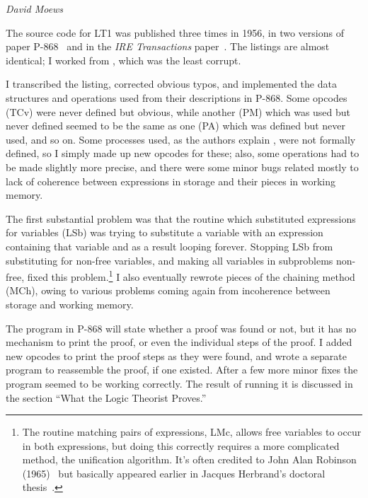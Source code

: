 \documentclass{IEEEcsmag}
\begin{document}
%
%


{\em David Moews}

The source code for LT1 was published three times in 1956, in two
versions of paper P-868~\cite{LT1956a,LT1956b} and in the 
\textit{IRE Transactions} paper~\cite{LT1956c}.  The listings are almost identical; I
worked from \cite{LT1956b}, which was the least corrupt.

I transcribed the listing, corrected obvious typos, and
implemented the data structures and operations used from their
descriptions in P-868.  Some opcodes (TCv) were never defined
but obvious, while another (PM) which was used but never defined
seemed to be the same as one (PA) which was defined but never
used, and so on.  Some processes used, as the authors explain
\cite[p.~50]{LT1956b}, were not formally defined, so I simply
made up new opcodes for these; also, some operations had to
be made slightly more precise, and there were some minor bugs
related mostly to lack of coherence between expressions in
storage and their pieces in working memory.  

The first substantial problem was that the routine 
which substituted expressions for variables (LSb)
was trying to substitute a variable with an expression
containing that variable and as a result looping forever.  
Stopping LSb from substituting for non-free variables, and making 
all variables in subproblems non-free, fixed this problem.\footnote{The 
routine matching pairs of expressions, LMc, allows
free variables to occur in both expressions, but doing this correctly 
requires a more complicated method, the unification algorithm.  It's 
often credited to John Alan Robinson (1965)~\cite{robinson1965} but basically
appeared earlier in Jacques Herbrand's doctoral thesis~\cite[Section~18]{lecherbrand2009}.}
I also eventually rewrote pieces of the chaining method (MCh),
owing to various problems coming again from incoherence 
between storage and working memory.

The program in P-868 will state whether a proof was found or not,
but it has no mechanism to print the proof, or even the individual
steps of the proof.  I added new opcodes to print the proof steps
as they were found, and wrote a separate program to reassemble the 
proof, if one existed.  After a few more minor fixes the program seemed 
to be working correctly.  The result of running it is discussed in the section
``What the Logic Theorist Proves.''
\end{document}
